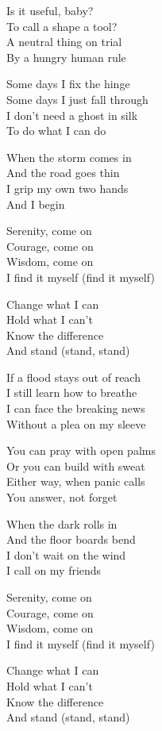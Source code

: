 \begin{lyrics}
Is it useful, baby?\\
To call a shape a tool?\\
A neutral thing on trial\\
By a hungry human rule

Some days I fix the hinge\\
Some days I just fall through\\
I don't need a ghost in silk\\
To do what I can do

When the storm comes in\\
And the road goes thin\\
I grip my own two hands\\
And I begin

Serenity, come on\\
Courage, come on\\
Wisdom, come on\\
I find it myself (find it myself)

Change what I can\\
Hold what I can't\\
Know the difference\\
And stand (stand, stand)

If a flood stays out of reach\\
I still learn how to breathe\\
I can face the breaking news\\
Without a plea on my sleeve

You can pray with open palms\\
Or you can build with sweat\\
Either way, when panic calls\\
You answer, not forget

When the dark rolls in\\
And the floor boards bend\\
I don't wait on the wind\\
I call on my friends

Serenity, come on\\
Courage, come on\\
Wisdom, come on\\
I find it myself (find it myself)

Change what I can\\
Hold what I can't\\
Know the difference\\
And stand (stand, stand)


\end{lyrics}
